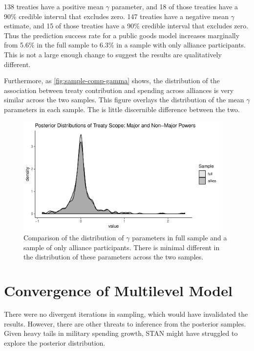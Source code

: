 \documentclass[12pt]{article}
\begin{document}
138 treaties have a positive mean $\gamma$ parameter, and 18 of those treaties have a 90\% credible interval that excludes zero. 
147 treaties have a negative mean $\gamma$ estimate, and 15 of those treaties have a 90\% credible interval that excludes zero.
Thus the prediction success rate for a public goods model increases marginally from 5.6\% in the full sample to 6.3\%  in a sample with only alliance participants. 
This is not a large enough change to suggest the results are qualitatively different. 


Furthermore, as \autoref{fig:sample-comp-gamma} shows, the distribution of the association between treaty contribution and spending across alliances is very similar across the two samples. 
This figure overlays the distribution of the mean $\gamma$ parameters in each sample. 
The is little discernible difference between the two. 


\begin{figure}
	\centering
		\includegraphics[width=0.95\textwidth]{sample-comp-gamma.pdf}
	\caption{Comparison of the distribution of $\gamma$ parameters in full sample and a sample of only alliance participants. There is minimal different in the distribution of these parameters across the two samples.}
	\label{fig:sample-comp-gamma}
\end{figure}






\section{Convergence of Multilevel Model} 


There were no divergent iterations in sampling, which would have invalidated the results. 
However, there are other threats to inference from the posterior samples. 
Given heavy tails in military spending growth, STAN might have struggled to explore the posterior distribution. 
\end{document}
